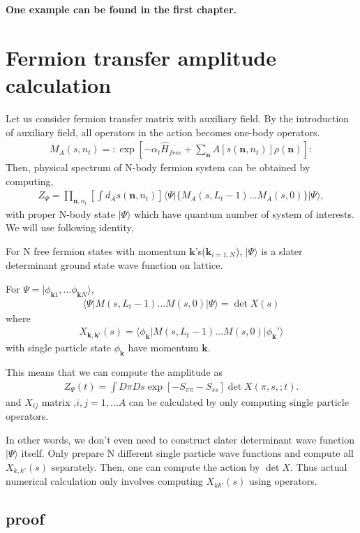\documentclass[10pt]{book}
\def\bm{\boldsymbol}
\newcommand{\bea}{\begin{eqnarray}}
\newcommand{\eea}{\end{eqnarray}}
\def\vk{{\bm k}}
\def\vn{{\bm n}}
\def\la{\langle}
\def\ra{\rangle}
\begin{document}
{\color{red} {\bf One example can be found in the first chapter.} }


\section{Fermion transfer amplitude calculation}
Let us consider fermion transfer matrix with auxiliary field. 
By the introduction of auxiliary field, all operators in the action becomes
one-body operators.
\bea 
M_A(s,n_t)=:\exp\left[-\alpha_t \hat{H}_{free}+\sum_{\vn} A[s(\vn,n_t)] \rho(\vn) \right]:
\eea 
Then, physical spectrum of N-body fermion system can be obtained by computing,
\bea 
Z_{\Psi}=\prod_{\vn,n_t}[\int d_A s(\vn,n_t)]\la \Psi| \{ M_A(s,L_t-1)\dots M_A(s,0)   \} |\Psi\ra , 
\eea 
with proper N-body state $|\Psi\ra$ which have quantum number of system of interests. 
We will use following identity,

\begin{framed}
For N free fermion states with momentum $\vk$'s($\vk_{i=1,N}$), $|\Psi\ra $
is a slater determinant ground state wave function on lattice.

For $\Psi=|\phi_{\vk 1},\dots\phi_{\vk N}\ra$,
\bea 
\la \Psi| M(s,L_t-1)\dots M(s,0)|\Psi\ra =\det X(s)
\eea 
where
\bea 
X_{\vk,\vk'}(s)=\la \phi_\vk|M(s,L_t-1)\dots M(s,0)|\phi_\vk'\ra 
\eea 
with single particle state $\phi_\vk$ have momentum $\vk$. 
\end{framed}

This means that we can compute the amplitude as
\bea 
Z_\Psi(t)= \int D\pi D s\exp[-S_{\pi\pi}-S_{ss}]\det X(\pi,s,;t).
\eea 
and $X_{ij}$ matrix ,$i,j=1,\dots A$ can be
calculated by only computing single particle operators.

In other words, we don't even need to construct slater determinant wave function $|\Psi\ra$ itself.
Only prepare N different single particle wave functions and compute all
$X_{k,k'}(s)$ separately. Then, one can compute the action by $\det{X}$. 
Thus actual numerical calculation only involves computing $X_{kk'}(s)$ using
operators. 

\subsection{proof}
\end{document}
